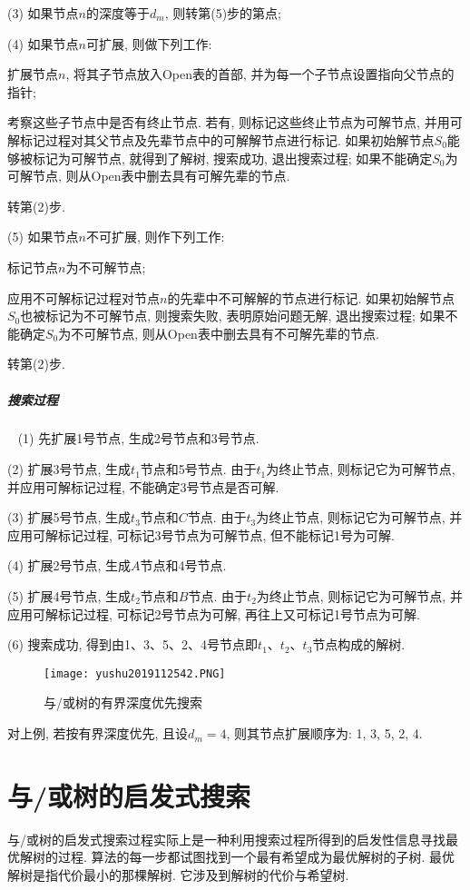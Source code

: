 (3) 如果节点$n$的深度等于$d_m$, 则转第(5)步的第点;

(4) 如果节点$n$可扩展, 则做下列工作:

    扩展节点$n$, 将其子节点放入Open表的首部, 并为每一个子节点设置指向父节点的指针;

     考察这些子节点中是否有终止节点. 若有, 则标记这些终止节点为可解节点, 并用可解标记过程对其父节点及先辈节点中的可解解节点进行标记. 如果初始解节点$S_0$能够被标记为可解节点, 就得到了解树, 搜索成功, 退出搜索过程; 如果不能确定$S_0$为可解节点, 则从Open表中删去具有可解先辈的节点.

    转第(2)步.

(5) 如果节点$n$不可扩展, 则作下列工作:

   \quad{} 标记节点$n$为不可解节点;

   \quad{} 应用不可解标记过程对节点$n$的先辈中不可解解的节点进行标记. 如果初始解节点$S_0$也被标记为不可解节点, 则搜索失败, 表明原始问题无解, 退出搜索过程; 如果不能确定$S_0$为不可解节点, 则从Open表中删去具有不可解先辈的节点.

   \quad{} 转第(2)步.
\subparagraph{搜索过程}~{}
(1) 先扩展1号节点, 生成2号节点和3号节点.

(2) 扩展3号节点, 生成$t_1$节点和5号节点. 由于$t_1$为终止节点, 则标记它为可解节点, 并应用可解标记过程, 不能确定3号节点是否可解.

(3) 扩展5号节点, 生成$t_3$节点和$C$节点. 由于$t_3$为终止节点, 则标记它为可解节点, 并应用可解标记过程, 可标记3号节点为可解节点, 但不能标记1号为可解.

(4) 扩展2号节点, 生成$A$节点和4号节点.

(5) 扩展4号节点, 生成$t_2$节点和$B$节点. 由于$t_2$为终止节点, 则标记它为可解节点, 并应用可解标记过程, 可标记2号节点为可解, 再往上又可标记1号节点为可解.

(6) 搜索成功, 得到由1、3、5、2、4号节点即$t_1$、$t_2$、$t_3$节点构成的解树.
\begin{figure}[H]
\centering
\texttt{[image: yushu2019112542.PNG]}
\caption{与/或树的有界深度优先搜索}
\label{AI32fig42}
\end{figure}
对上例, 若按有界深度优先, 且设$d_m=4$, 则其节点扩展顺序为: 1, 3, 5, 2, 4.
\section{与/或树的启发式搜索}
与/或树的启发式搜索过程实际上是一种利用搜索过程所得到的启发性信息寻找最优解树的过程. 算法的每一步都试图找到一个最有希望成为最优解树的子树.
最优解树是指代价最小的那棵解树. 它涉及到解树的代价与希望树.
